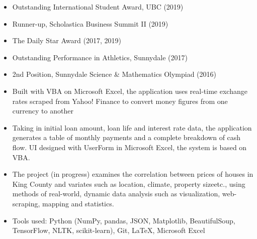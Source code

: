 

\begin{itemize}
    \item Outstanding International Student Award, UBC (2019)
    \item Runner-up, Scholastica Business Summit II (2019)
    \item The Daily Star Award (2017, 2019)
    \item Outstanding Performance in Athletics, Sunnydale (2017)
    \item 2nd Position, Sunnydale Science \& Mathematics Olympiad (2016)
    
\end{itemize}


\begin{itemize}
    \item Built with VBA on Microsoft Excel, the application uses real-time exchange rates scraped from Yahoo! Finance to convert money figures from one currency to another
\end{itemize}

\smallskip


\begin{itemize}

    \item Taking in initial loan amount, loan life and interest rate data, the application generates a table of monthly payments and a complete breakdown of cash flow. UI designed with UserForm in Microsoft Excel, the system is based on VBA.
\end{itemize}

\smallskip


\begin{itemize}
    \item The  project (in  progress) examines  the correlation  between  prices  of  houses  in  King  County  and  variates  such  as  location,  climate, property sizeetc., using methods of real-world, dynamic data analysis such as visualization, web-scraping, mapping and statistics.
    \item Tools used: Python (NumPy, pandas, JSON, Matplotlib, BeautifulSoup, TensorFlow, NLTK, scikit-learn), Git, LaTeX, Microsoft Excel
\end{itemize}


